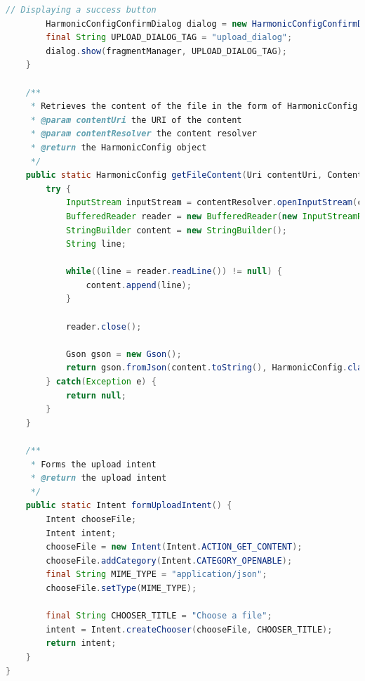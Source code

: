 \documentclass[oneside,solution]{android-assign}
\begin{document}
\begin{lstlisting}[language=java]
        // Displaying a success button
        HarmonicConfigConfirmDialog dialog = new HarmonicConfigConfirmDialog(config, () -> acceptCallback.accept(config), () -> {});
        final String UPLOAD_DIALOG_TAG = "upload_dialog";
        dialog.show(fragmentManager, UPLOAD_DIALOG_TAG);
    }

    /**
     * Retrieves the content of the file in the form of HarmonicConfig
     * @param contentUri the URI of the content
     * @param contentResolver the content resolver
     * @return the HarmonicConfig object
     */
    public static HarmonicConfig getFileContent(Uri contentUri, ContentResolver contentResolver) {
        try {
            InputStream inputStream = contentResolver.openInputStream(contentUri);
            BufferedReader reader = new BufferedReader(new InputStreamReader(inputStream));
            StringBuilder content = new StringBuilder();
            String line;

            while((line = reader.readLine()) != null) {
                content.append(line);
            }

            reader.close();

            Gson gson = new Gson();
            return gson.fromJson(content.toString(), HarmonicConfig.class);
        } catch(Exception e) {
            return null;
        }
    }

    /**
     * Forms the upload intent
     * @return the upload intent
     */
    public static Intent formUploadIntent() {
        Intent chooseFile;
        Intent intent;
        chooseFile = new Intent(Intent.ACTION_GET_CONTENT);
        chooseFile.addCategory(Intent.CATEGORY_OPENABLE);
        final String MIME_TYPE = "application/json";
        chooseFile.setType(MIME_TYPE);

        final String CHOOSER_TITLE = "Choose a file";
        intent = Intent.createChooser(chooseFile, CHOOSER_TITLE);
        return intent;
    }
}
\end{lstlisting}
\end{document}
